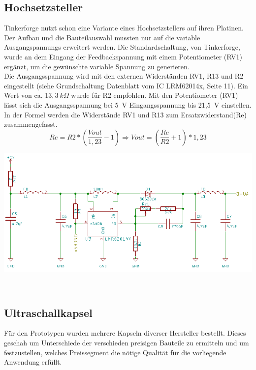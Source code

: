 \subsection{Hochsetzsteller}
Tinkerforge nutzt schon eine Variante eines Hochsetzstellers auf ihren Platinen. Der Aufbau und die Bauteilauswahl mussten nur auf die variable Ausgangspannungs erweitert werden. Die Standardschaltung, von Tinkerforge, wurde an dem Eingang der Feedbackspannung mit einem Potentiometer (RV1) ergänzt, um die gewünschte variable Spannung zu generieren.\\
Die Ausgangsspannung wird mit den externen Widerständen RV1, R13 und R2 eingestellt (siehe Grundschaltung Datenblatt vom IC LRM62014x, Seite 11). Ein Wert von ca. \(\displaystyle 13,3~k\Omega \) wurde für R2 empfohlen. Mit den Potentiometer (RV1) lässt sich die Ausgangsspannung bei 5~V Eingangsspannung bis 21,5~V einstellen. In der Formel werden die Widerstände RV1 und R13 zum Ersatzwiderstand(Re) zusammengefasst.
\onehalfspacing \\
\[\displaystyle Re=R2*\left(\frac{Vout}{1,23}-1\right) \Rightarrow Vout=\left(\frac{Re}{R2}+1\right)*1,23\] 
\singlespacing
\begin{center}
\begin{minipage}{1\textwidth}
\includegraphics[width=1\textwidth%
]{Abbildungen/Pumpe.png}
\label{fig:Hochsetzsteller}
\end{minipage}\\
\end{center}

\subsection{Ultraschallkapsel}%
Für den Prototypen wurden mehrere Kapseln diverser Hersteller bestellt. Dieses geschah um Unterschiede der verschieden preisigen Bauteile zu ermitteln und um festzustellen, welches Preissegment die nötige Qualität für die vorliegende Anwendung erfüllt.


